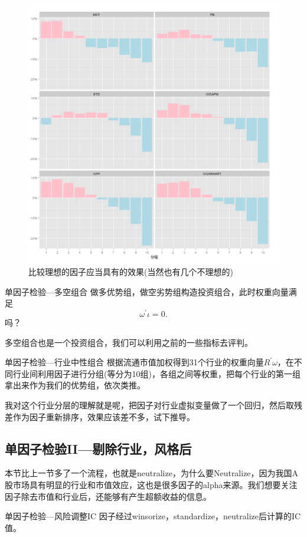 \documentclass[12pt]{article}
\theoremstyle{definition}
\begin{document}
\begin{figure}[htb]
\centering
\includegraphics[scale=0.7]{figure/因子单调性.jpg}
\caption{比较理想的因子应当具有的效果(当然也有几个不理想的)}
\end{figure}

\begin{sdefinition}{单因子检验—多空组合}{}
做多优势组，做空劣势组构造投资组合，此时权重向量满足
$$
\omega^\prime \iota = 0.
$$
吗？
\end{sdefinition}
多空组合也是一个投资组合，我们可以利用之前的一些指标去评判。

\begin{sdefinition}{单因子检验—行业中性组合}{}
根据流通市值加权得到31个行业的权重向量$R^\prime \omega$，在不同行业间利用因子进行分组(等分为10组)，各组之间等权重，把每个行业的第一组拿出来作为我们的优势组，依次类推。
\end{sdefinition}
\begin{sremark}{}{}
我对这个行业分层的理解就是呢，把因子对行业虚拟变量做了一个回归，然后取残差作为因子重新排序，效果应该差不多，试下推导。
\end{sremark}

\subsection{单因子检验II—剔除行业，风格后}
本节比上一节多了一个流程，也就是neutralize，为什么要Neutralize，因为我国A股市场具有明显的行业和市值效应，这也是很多因子的alpha来源。我们想要关注因子除去市值和行业后，还能够有产生超额收益的信息。
\begin{sdefinition}{单因子检验—风险调整IC}{}
	因子经过winsorize，standardize，neutralize后计算的IC值。
\end{sdefinition}
\end{document}
